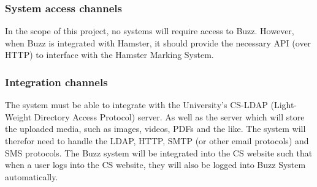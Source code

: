 \documentclass[12pt]{article}
\begin{document}
\subsubsection{System access channels}
In the scope of this project, no systems will require access to Buzz. However, when Buzz is integrated with Hamster, it should provide the necessary API (over HTTP) to interface with the Hamster Marking System.

\subsubsection{Integration channels}
The system must be able to integrate with the University's CS-LDAP (Light-Weight Directory Access Protocol) server. As well as the server which will store the uploaded media, such as images, videos, PDFs and the like. The system will therefor need to handle the LDAP, HTTP, SMTP (or other email protocols) and SMS protocols. The Buzz system will be integrated into the CS website such that when a user logs into the CS website, they will also be logged into Buzz System automatically.
\end{document}
